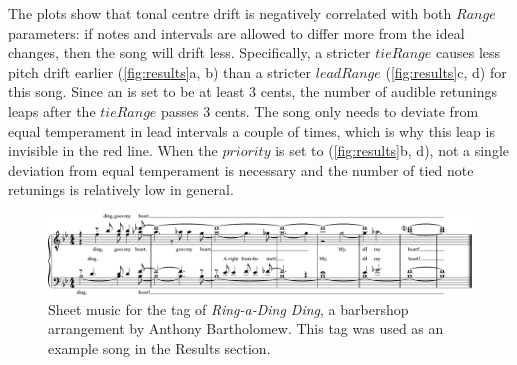 \documentclass[a4paper]{article}
\begin{document}
The plots show that tonal centre drift is negatively correlated with both $\mathit{Range}$ parameters: if notes and intervals are allowed to differ more from the ideal changes, then the song will drift less. Specifically, a stricter $\mathit{tieRange}$ causes less pitch drift earlier (\ref{fig:results}a, b) than a stricter $\mathit{leadRange}$ (\ref{fig:results}c, d) for this song. Since an  is set to be at least 3 cents, the number of audible retunings leaps after the $\mathit{tieRange}$ passes 3 cents. The song only needs to deviate from equal temperament in lead intervals a couple of times, which is why this leap is invisible in the red line. When the $\mathit{priority}$ is set to  (\ref{fig:results}b, d), not a single deviation from equal temperament is necessary and the number of tied note retunings is relatively low in general.

\begin{figure}
	\centering
	\includegraphics[width=\linewidth]{Figures/Ding_MuseScore.pdf}
	\caption{Sheet music for the tag of \textit{Ring-a-Ding Ding}, a barbershop arrangement by Anthony Bartholomew. This tag was used as an example song in the Results section.}
	\label{fig:ding_sheets}
\end{figure}
\end{document}
